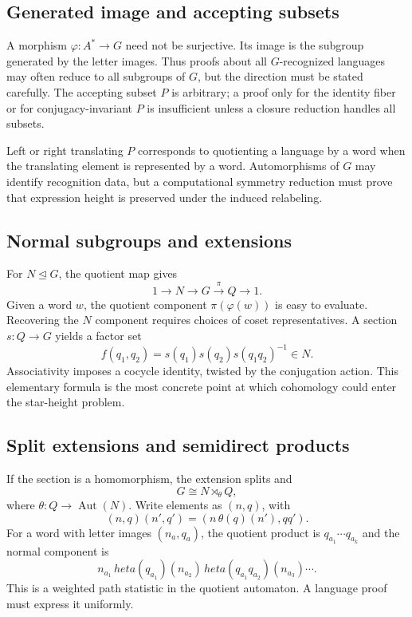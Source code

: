 \documentclass{amsart}
\begin{document}
\subsection{Generated image and accepting subsets}

A morphism $\varphi:A^\ast\to G$ need not be surjective.  Its image is the subgroup generated by the letter images.  Thus proofs about all $G$-recognized languages may often reduce to all subgroups of $G$, but the direction must be stated carefully.  The accepting subset $P$ is arbitrary; a proof only for the identity fiber or for conjugacy-invariant $P$ is insufficient unless a closure reduction handles all subsets.

Left or right translating $P$ corresponds to quotienting a language by a word when the translating element is represented by a word.  Automorphisms of $G$ may identify recognition data, but a computational symmetry reduction must prove that expression height is preserved under the induced relabeling.

\subsection{Normal subgroups and extensions}

For $N\trianglelefteq G$, the quotient map gives
\[
1\longrightarrow N\longrightarrow G\stackrel{\pi}{\longrightarrow}Q\longrightarrow1.
\]
Given a word $w$, the quotient component $\pi(\varphi(w))$ is easy to evaluate.  Recovering the $N$ component requires choices of coset representatives.  A section $s:Q\to G$ yields a factor set
\[
  f(q_1,q_2)=s(q_1)s(q_2)s(q_1q_2)^{-1}\in N.
\]
Associativity imposes a cocycle identity, twisted by the conjugation action.  This elementary formula is the most concrete point at which cohomology could enter the star-height problem.

\subsection{Split extensions and semidirect products}

If the section is a homomorphism, the extension splits and
\[
G\cong N\rtimes_\theta Q,
\]
where $\theta:Q\to\operatorname{Aut}(N)$.  Write elements as $(n,q)$, with
\[
(n,q)(n',q')=(n\,\theta(q)(n'),qq').
\]
For a word with letter images $(n_a,q_a)$, the quotient product is $q_{a_1}\cdots q_{a_k}$ and the normal component is
\[
  n_{a_1}\,	heta(q_{a_1})(n_{a_2})\,	heta(q_{a_1}q_{a_2})(n_{a_3})\cdots.
\]
This is a weighted path statistic in the quotient automaton.  A language proof must express it uniformly.
\end{document}
